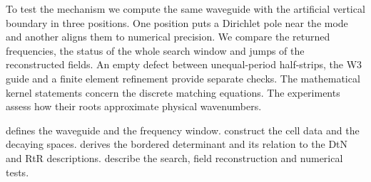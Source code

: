 To test the mechanism we compute the same waveguide with the artificial
vertical boundary in three positions. One position puts a Dirichlet pole
near the mode and another aligns them to numerical precision. We compare
the returned frequencies, the status of the whole search window and jumps
of the reconstructed fields. An empty defect between unequal-period
half-strips, the W3 guide and a finite element refinement provide separate
checks. The mathematical kernel statements concern the discrete matching
equations. The experiments assess how their roots approximate physical
wavenumbers.

 defines the waveguide and the frequency window.
 construct the cell data and the decaying
spaces.  derives the bordered determinant and its relation
to the DtN and RtR descriptions. 
describe the search, field reconstruction and numerical tests.
